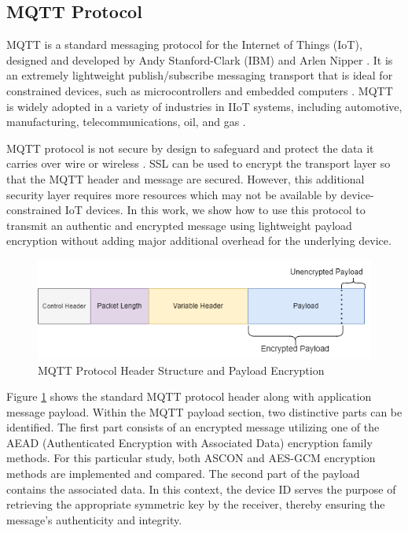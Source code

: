 
\subsection{MQTT Protocol }



MQTT is a standard messaging protocol for the Internet of Things (IoT), designed and developed by Andy Stanford-Clark (IBM) and Arlen Nipper \cite{bryce_mqtt-g_2018}. It is an extremely lightweight publish/subscribe messaging transport that is ideal for constrained devices, such as microcontrollers and embedded computers \cite{andy_attack_2017}. MQTT is widely adopted in a variety of industries in IIoT systems, including automotive, manufacturing, telecommunications, oil, and gas \cite{atalayDigitalTwinsApproach2020}. 

MQTT protocol is not secure by design to safeguard and protect the data it carries over wire or wireless \cite{andy_attack_2017}. SSL can be used to encrypt the transport layer so that the MQTT header and message are secured. However, this additional security layer requires more resources which may not be available by device-constrained IoT devices. In this work, we show how to use this protocol to transmit an authentic and encrypted message using lightweight payload encryption without adding major additional overhead for the underlying device. 


\begin{figure}[H]
    \centering
    \includegraphics[width=\linewidth]{images/fp/mqttprotocol.drawio.png}
    \caption{MQTT Protocol Header Structure and Payload Encryption}
    \label{fig:mqtt}
\end{figure}

Figure \ref{fig:mqtt} shows the standard MQTT protocol header along with application message payload. Within the MQTT payload section, two distinctive parts can be identified. The first part consists of an encrypted message utilizing one of the AEAD (Authenticated Encryption with Associated Data) encryption family methods. For this particular study, both ASCON and AES-GCM encryption methods are implemented and compared. The second part of the payload contains the associated data. In this context, the device ID serves the purpose of retrieving the appropriate symmetric key by the receiver, thereby ensuring the message's authenticity and integrity.


